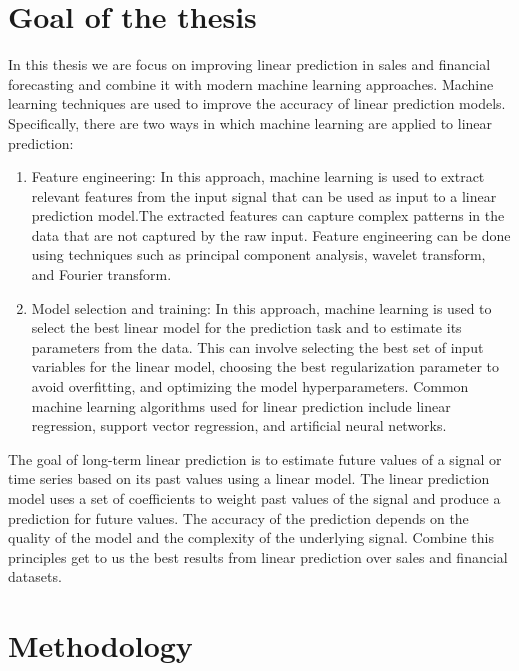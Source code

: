\chapter{Goal of the thesis} \label{sec:goal}
In this thesis we are focus on improving linear prediction in sales and financial forecasting and combine it with
modern machine learning approaches. Machine learning techniques are used to improve the accuracy of linear
prediction models. Specifically, there are two ways in which machine learning are applied to linear prediction:
\begin{enumerate}
    \item Feature engineering: In this approach, machine learning is used to extract relevant features from the input
    signal that can be used as input to a linear prediction model.The extracted features can capture complex patterns
    in the data that are not captured by the raw input. Feature engineering can be done using techniques such as
    principal component analysis, wavelet transform, and Fourier transform.
    \item Model selection and training: In this approach, machine learning is used to select the best linear
    model for the prediction task and to estimate its parameters from the data. This can involve selecting the best
    set of input variables for the linear model, choosing the best regularization parameter to avoid overfitting, and
    optimizing the model hyperparameters. Common machine learning algorithms used for linear prediction include linear
    regression, support vector regression, and artificial neural networks.
\end{enumerate}
The goal of long-term linear prediction is to estimate future values of a signal or time series based on its past
values using a linear model.
The linear prediction model uses a set of coefficients to weight past values of the signal and produce a prediction for
future values. The accuracy of the prediction depends on the quality of the model and the complexity of the
underlying signal. Combine this principles get to us the best results from linear prediction over
sales and financial datasets.
\chapter{Methodology} \label{sec:methodology}
